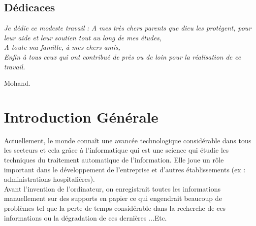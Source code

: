 \documentclass[11pt,a4paper,onecolumn,openright,oneside]{report}
\begin{document}
    \chapter*{\huge Dédicaces}
	
	\begin{center}
		\it \Large
		Je dédie ce modeste travail :
		A mes très chers parents que dieu les
		protègent, pour leur aide et leur soutien tout au long
		de mes études,\\
		
		A toute ma famille, à mes chers amis,\\
		
		Enfin à tous ceux qui ont contribué de près
		ou de loin pour la réalisation de ce travail.\\
		
		\leftskip=12cm
		
		Mohand.
		
		\leftskip=0cm
		
	\end{center}
	
	\tableofcontents
	\listoffigures
	\listoftables

	

	\pagestyle{fancy}
	\fancyhead{}
	
	\renewcommand{\chaptermark}[1]{\markboth{\bsc{\chaptername~\thechapter{} :} #1}{}}
	
	\lhead[\textsl{\rightmark}]{\textsl{\leftmark}}
	
	\renewcommand{\headrulewidth}{1.2pt}
	
	\newcommand\blfootnote[1]{
		\begingroup
		\renewcommand\thefootnote{}\footnote{#1}
		\addtocounter{footnote}{-1}
		\endgroup
	}

	\part{Introduction Générale}
		Actuellement, le monde connaît une avancée technologique considérable dans tous les secteurs et cela grâce à l'informatique qui est une science qui étudie les techniques du traitement automatique de l'information. Elle joue un rôle important dans le développement de l'entreprise et d'autres établissements (ex : administrations hospitalières).\\

		Avant l'invention de l'ordinateur, on enregistrait toutes les informations manuellement sur des supports en papier ce qui engendrait beaucoup de problèmes tel que la perte de temps considérable dans la recherche de ces informations ou la dégradation de ces dernières ...Etc.\\
		
\end{document}
